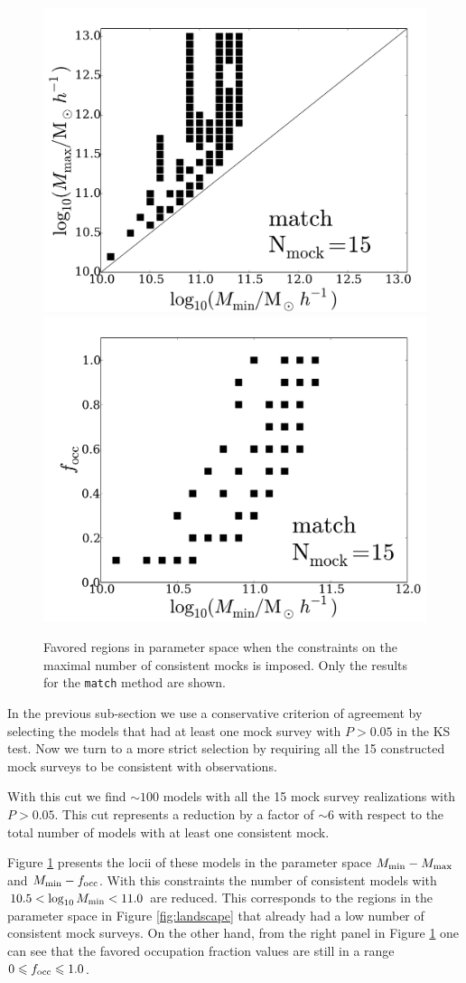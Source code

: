 \documentclass[usenatbib]{mn2e}
\begin{document}
\begin{figure}
\begin{center}
\includegraphics[width=0.46\linewidth,angle=0]{Fig5_match_mass_mock.pdf} 
\hspace{5mm}
\includegraphics[width=0.46\linewidth,angle=0]{Fig5_match_f_occ_mock.pdf}
\end{center}  
\caption{Favored regions in parameter space when the constraints on
  the maximal number of consistent mocks is imposed. Only the results
  for the {\texttt{match}} method are shown.
  \label{fig:restriction_mock}}  
\end{figure}


In the previous sub-section we use a conservative criterion of
agreement by selecting the models that had at least one mock survey
with $P>0.05$ in the KS test. Now we turn to a more strict selection
by requiring all the 15 constructed mock surveys to be consistent with
observations. 



With
this cut we find $\sim 100$ models with all the 15 mock survey
realizations with $P>0.05$.  This cut represents a reduction by a
factor of $\sim 6$ with respect to the total number of models with at
least one consistent mock.

Figure \ref{fig:restriction_mock} presents the locii of these models
in the parameter space $M_{\rm min}-M_{\rm max}$ and $M_{\rm
  min}-f_{\rm occ}$. With this constraints the number of consistent
models with  $10.5 < \log_{10}M_{\rm min}< 11.0$ are reduced. This 
corresponds to the regions in the parameter space in
Figure \ref{fig:landscape} that already had a low number of 
consistent mock surveys. On the other hand, from the right panel in
Figure \ref{fig:restriction_mock} one can see that the favored
occupation fraction  values are still in a range $0\leq f_{\rm
  occ}\leq 1.0$.
\end{document}
